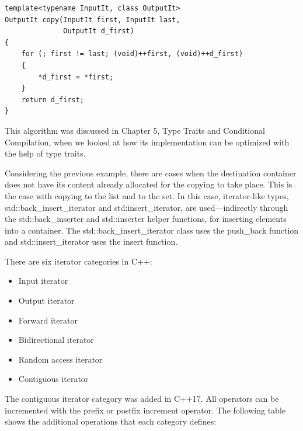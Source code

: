 \begin{lstlisting}[style=styleCXX]
template<typename InputIt, class OutputIt>
OutputIt copy(InputIt first, InputIt last,
			  OutputIt d_first)
{
	for (; first != last; (void)++first, (void)++d_first)
	{
		*d_first = *first;
	}
	return d_first;
}
\end{lstlisting}

\begin{tcolorbox}[breakable,enhanced jigsaw,colback=blue!5!white,colframe=blue!75!black,title={Important Note}]
This algorithm was discussed in Chapter 5, Type Traits and Conditional Compilation, when we looked at how its implementation can be optimized with the help of type traits.
\end{tcolorbox}

Considering the previous example, there are cases when the destination container does not have its content already allocated for the copying to take place. This is the case with copying to the list and to the set. In this case, iterator-like types, std::back\_insert\_iterator and std:insert\_iterator, are used—indirectly through the std::back\_inserter and std::inserter helper functions, for inserting elements into a container. The std::back\_insert\_iterator class uses the push\_back function and std::insert\_iterator uses the insert function.

There are six iterator categories in C++:

\begin{itemize}
\item
Input iterator

\item
Output iterator

\item
Forward iterator

\item
Bidirectional iterator

\item
Random access iterator

\item
Contiguous iterator
\end{itemize}

The contiguous iterator category was added in C++17. All operators can be incremented with the prefix or postfix increment operator. The following table shows the additional operations that each category defines:

